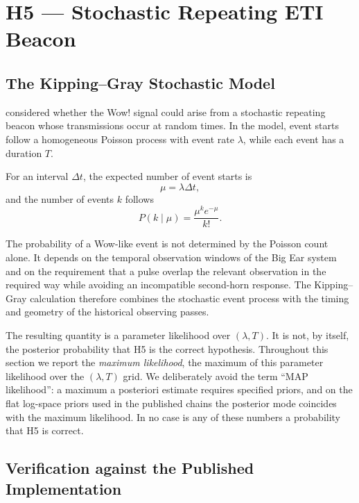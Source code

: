 \documentclass[twocolumn]{aastex701}
\begin{document}
\section{H5 --- Stochastic Repeating ETI Beacon}
\label{sec:h5}

\subsection{The Kipping--Gray Stochastic Model}

\citet{kipping2022} considered whether the Wow! signal could arise from a stochastic repeating beacon whose transmissions occur at random times. In the model, event starts follow a homogeneous Poisson process with event rate $\lambda$, while each event has a duration $T$.

For an interval $\Delta t$, the expected number of event starts is
\begin{equation}
\mu=\lambda\Delta t,
\end{equation}
and the number of events $k$ follows
\begin{equation}
P(k\mid\mu)=
\frac{\mu^k e^{-\mu}}{k!}.
\label{eq:poisson}
\end{equation}

The probability of a Wow-like event is not determined by the Poisson count alone. It depends on the temporal observation windows of the Big Ear system and on the requirement that a pulse overlap the relevant observation in the required way while avoiding an incompatible second-horn response. The Kipping--Gray calculation therefore combines the stochastic event process with the timing and geometry of the historical observing passes.

The resulting quantity is a parameter likelihood over $(\lambda,T)$. It is not, by itself, the posterior probability that H5 is the correct hypothesis. Throughout this section we report the {\em maximum likelihood}, the maximum of this parameter likelihood over the $(\lambda,T)$ grid. We deliberately avoid the term ``MAP likelihood'': a maximum a posteriori estimate requires specified priors, and on the flat log-space priors used in the published chains the posterior mode coincides with the maximum likelihood. In no case is any of these numbers a probability that H5 is correct.

\subsection{Verification against the Published Implementation}
\label{sec:h5_verify}
\end{document}

